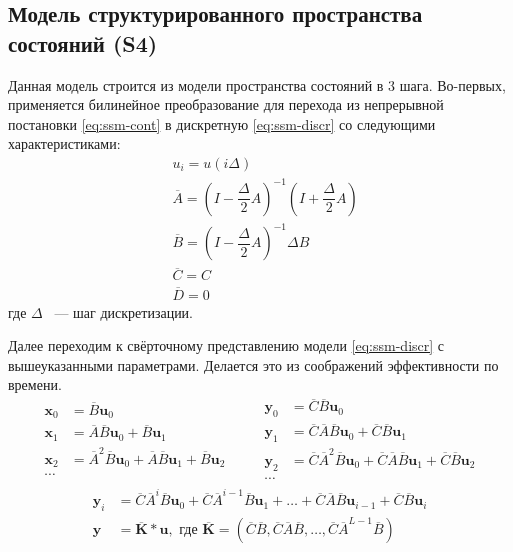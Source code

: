 \documentclass[a4paper, 12pt]{article}
\newcommand{\bx}{\mathbf{x}}
\newcommand{\by}{\mathbf{y}}
\newcommand{\bu}{\mathbf{u}}
\begin{document}
	\subsection{Модель структурированного пространства состояний (S4)}
	Данная модель строится из модели пространства состояний в 3 шага. Во-первых, применяется билинейное преобразование для перехода из непрерывной постановки \ref{eq:ssm-cont} в дискретную \ref{eq:ssm-discr} со следующими характеристиками:
	\begin{align*}
		&u_i = u(i\Delta) \\
		&\overline{A} = (I - \dfrac{\Delta}{2} A)^{-1} (I + \dfrac{\Delta}{2} A) \\
		&\overline{B} = (I - \dfrac{\Delta}{2} A)^{-1} \Delta B \\
		&\overline{C} = C \\
		&\overline{D} = 0
	\end{align*}
	где $\Delta$ ~--- шаг дискретизации.
	
	Далее переходим к свёрточному представлению модели \ref{eq:ssm-discr} с вышеуказанными параметрами. Делается это из соображений эффективности по времени.
	\begin{equation*}
		\begin{split}
			\bx_0 &= \overline{B}\bu_0 \\
			\bx_1 &= \overline{A}\overline{B}\bu_0 + \overline{B}\bu_1 \\
			\bx_2 &= \overline{A}^2\overline{B}\bu_0 + \overline{A}\overline{B}\bu_1 + \overline{B}\bu_2 \\
			\cdots 
		\end{split}
		\qquad
		\begin{split}
			\by_0 &= \overline{C}\overline{B}\bu_0 \\
			\by_1 &= \overline{C}\overline{A}\overline{B}\bu_0 + \overline{C}\overline{B}\bu_1 \\
			\by_2 &= \overline{C}\overline{A}^2\overline{B}\bu_0 + \overline{C}\overline{A}\overline{B}\bu_1 + \overline{C}\overline{B}\bu_2 \\
			\cdots 
		\end{split}
	\end{equation*}
	\begin{equation*}
		\begin{split}
			\by_i &= \overline{C}\overline{A}^i\overline{B}\bu_0 + \overline{C}\overline{A}^{i-1}\overline{B}\bu_1 + \ldots + \overline{C}\overline{A}\overline{B}\bu_{i-1} + \overline{C}\overline{B}\bu_i \\
			\by &= \overline{\mathbf{K}} \ast \bu, \text{ где } \overline{\mathbf{K}} = (\overline{C}\overline{B}, \overline{C}\overline{A}\overline{B}, \ldots, \overline{C}\overline{A}^{L-1}\overline{B}) 
		\end{split}
	\end{equation*}
\end{document}
